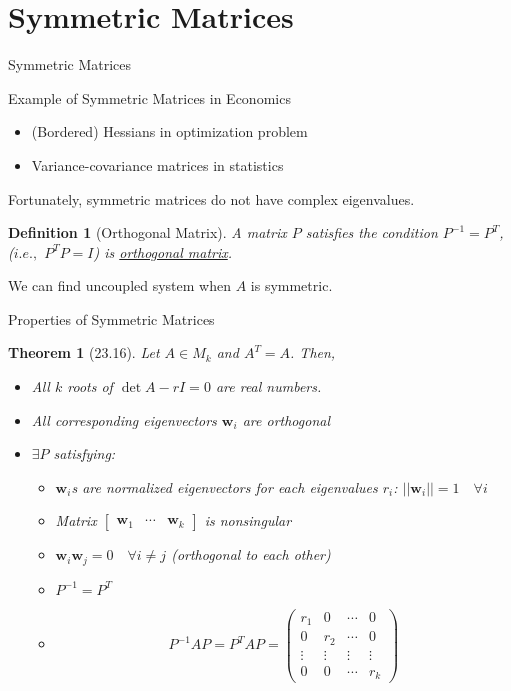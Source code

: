 \documentclass[a4paper,11pt]{article}
\newtheorem{defn}{Definition}
\newtheorem{thm}{Theorem}
\newcommand{\bd}{\mathbf}
\begin{document}
\section{Symmetric Matrices} %
\label{sec:symmetric_matrices}
\begin{frame}[t]{Symmetric Matrices}
	\begin{block}
		{Example of Symmetric Matrices in Economics}
		\begin{itemize}
			\item (Bordered) Hessians in optimization problem
			\item Variance-covariance matrices in statistics
		\end{itemize}
		Fortunately, symmetric matrices do not have complex eigenvalues. 
	\end{block}
	\begin{defn}
		[Orthogonal Matrix] A matrix $P$ satisfies the condition $P^{-1}=P^T$, ($i.e.,$ $P^T P = I$) is \uline{orthogonal matrix}.
	\end{defn}
	We can find uncoupled system when $A$ is symmetric.
\end{frame}
\begin{frame}[t]{Properties of Symmetric Matrices}
	\begin{thm}
		[23.16] Let $A\in M_k$ and $A^T=A$. Then, 
		\begin{itemize}
			\item All $k$ roots of $\det{A-rI}=0$ are real numbers. 
			\item All corresponding eigenvectors $\bd{w}_i$ are orthogonal
			\item $\exists P$ satisfying:
			\begin{itemize}
				\item $\bd{w}_i$s are normalized eigenvectors for each eigenvalues $r_i$: $||\bd{w}_i||=1 \quad\forall i$
				\item Matrix $\begin{bmatrix}\bd{w}_1&\cdots&\bd{w}_k
				\end{bmatrix}$ is nonsingular
				\item $\bd{w}_i\bd{w}_j=0\quad \forall i\neq j$ (orthogonal to each other)
				\item $P^{-1}=P^T$
				\item \[
					P^{-1}AP = P^TAP = \begin{pmatrix}
						r_1 & 0 & \cdots & 0\\
						0 & r_2 & \cdots & 0\\
						\vdots & \vdots & \vdots & \vdots\\
						0 & 0 & \cdots & r_k
					\end{pmatrix}
				\]
			\end{itemize}
		\end{itemize}
	\end{thm}
\end{frame}
\end{document}
